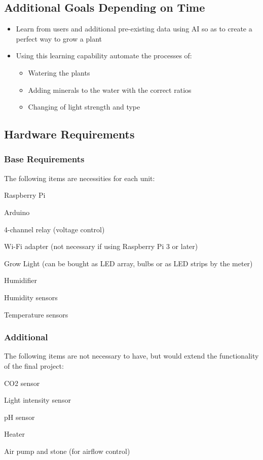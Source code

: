 \documentclass{article}
\begin{document}
	\subsection{Additional Goals Depending on Time}
		\begin{itemize}
			\item Learn from users and additional pre-existing data using AI so as to create a perfect way to grow a plant
			\item Using this learning capability automate the processes of:
				\begin{itemize}
					\item Watering the plants
					\item Adding minerals to the water with the correct ratios
					\item Changing of light strength and type
				\end{itemize}
		\end{itemize}
	\subsection{Hardware Requirements}
		\subsubsection{Base Requirements}
			The following items are necessities for each unit:
			\begin{list}
				\item Raspberry Pi
				\item Arduino
				\item 4-channel relay (voltage control)
				\item Wi-Fi adapter (not necessary if using Raspberry Pi 3 or later)
				\item Grow Light (can be bought as LED array, bulbs or as LED strips by the meter)
				\item Humidifier
				\item Humidity sensors
				\item Temperature sensors
			\end{list}
		\subsubsection{Additional}
			The following items are not necessary to have, but would extend the functionality of the final project:
			\begin{list}
				\item CO2 sensor
				\item Light intensity sensor
				\item pH sensor
				\item Heater
				\item Air pump and stone (for airflow control)
			\end{list}
\end{document}
